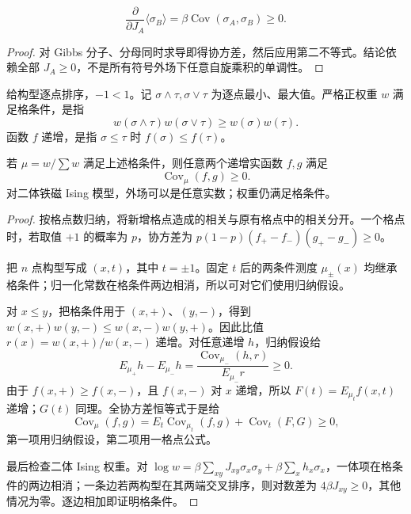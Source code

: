 \begin{corollary}[增加铁磁耦合时关联不减]
\[
 \frac{\partial}{\partial J_A}\langle\sigma_B\rangle
 =\beta\operatorname{Cov}(\sigma_A,\sigma_B)\ge0.
\]
\end{corollary}
\begin{proof}
对 Gibbs 分子、分母同时求导即得协方差，然后应用第二不等式。结论依赖全部 $J_A\ge0$，不是所有符号外场下任意自旋乘积的单调性。
\end{proof}

\begin{definition}[格条件与递增函数]
给构型逐点排序，$-1<1$。记 $\sigma\wedge\tau,\sigma\vee\tau$ 为逐点最小、最大值。严格正权重 $w$ 满足格条件，是指
\[
 w(\sigma\wedge\tau)w(\sigma\vee\tau)\ge w(\sigma)w(\tau).
\]
函数 $f$ 递增，是指 $\sigma\le\tau$ 时 $f(\sigma)\le f(\tau)$。
\end{definition}

\begin{theorem}
若 $\mu=w/\sum w$ 满足上述格条件，则任意两个递增实函数 $f,g$ 满足
\begin{equation}
 \operatorname{Cov}_\mu(f,g)\ge0.
 \label{eq:phys-sm-fkg-inequality}
\end{equation}
对二体铁磁 Ising 模型，外场可以是任意实数；权重仍满足格条件。
\end{theorem}
\begin{proof}
按格点数归纳，将新增格点造成的相关与原有格点中的相关分开。一个格点时，若取值 $+1$ 的概率为 $p$，协方差为 $p(1-p)(f_+-f_-)(g_+-g_-)\ge0$。

把 $n$ 点构型写成 $(x,t)$，其中 $t=\pm1$。固定 $t$ 后的两条件测度 $\mu_\pm(x)$ 均继承格条件；归一化常数在格条件两边相消，所以可对它们使用归纳假设。

对 $x\le y$，把格条件用于 $(x,+)$、$(y,-)$，得到 $w(x,+)w(y,-)\le w(x,-)w(y,+)$。因此比值 $r(x)=w(x,+)/w(x,-)$ 递增。对任意递增 $h$，归纳假设给
\[
 E_{\mu_+}h-E_{\mu_-}h
 =\frac{\operatorname{Cov}_{\mu_-}(h,r)}{E_{\mu_-}r}\ge0.
\]
由于 $f(x,+)\ge f(x,-)$，且 $f(x,-)$ 对 $x$ 递增，所以 $F(t)=E_{\mu_t}f(x,t)$ 递增；$G(t)$ 同理。全协方差恒等式于是给
\[
 \operatorname{Cov}_\mu(f,g)
 =E_t\operatorname{Cov}_{\mu_t}(f,g)+\operatorname{Cov}_t(F,G)\ge0,
\]
第一项用归纳假设，第二项用一格点公式。

最后检查二体 Ising 权重。对 $\log w=\beta\sum_{xy}J_{xy}\sigma_x\sigma_y+\beta\sum_xh_x\sigma_x$，一体项在格条件的两边相消；一条边若两构型在其两端交叉排序，则对数差为 $4\beta J_{xy}\ge0$，其他情况为零。逐边相加即证明格条件。
\end{proof}

